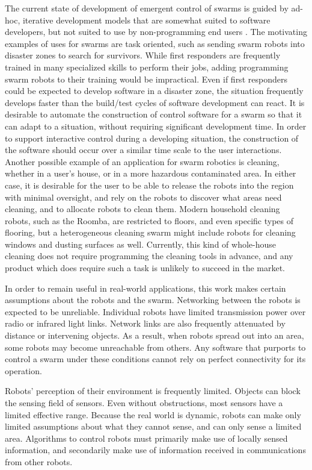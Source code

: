 \documentclass[]{article}
\begin{document}
The current state of development of emergent control of swarms is guided by ad-hoc, iterative development models that are somewhat suited to software developers, but not suited to use by non-programming end users \cite{palmer2005behavioral}.
The motivating examples of uses for swarms are task oriented, such as sending swarm robots into disaster zones to search for survivors. 
While first responders are frequently trained in many specialized skills to perform their jobs, adding programming swarm robots to their training would be impractical. 
Even if first responders could be expected to develop software in a disaster zone, the situation frequently develops faster than the build/test cycles of software development can react. 
It is desirable to automate the construction of control software for a swarm so that it can adapt to a situation, without requiring significant development time. 
In order to support interactive control during a developing situation, the construction of the software should occur over a similar time scale to the user interactions.
Another possible example of an application for swarm robotics is cleaning, whether in a user's house, or in a more hazardous contaminated area. 
In either case, it is desirable for the user to be able to release the robots into the region with minimal oversight, and rely on the robots to discover what areas need cleaning, and to allocate robots to clean them. 
Modern household cleaning robots, such as the Roomba, are restricted to floors, and even specific types of flooring, but a heterogeneous cleaning swarm might include robots for cleaning windows and dusting surfaces as well. 
Currently, this kind of whole-house cleaning does not require programming the cleaning tools in advance, and any product which does require such a task is unlikely to succeed in the market. 

In order to remain useful in real-world applications, this work makes certain assumptions about the robots and the swarm. 
Networking between the robots is expected to be unreliable. 
Individual robots have limited transmission power over radio or infrared light links. 
Network links are also frequently attenuated by distance or intervening objects. 
As a result, when robots spread out into an area, some robots may become unreachable from others. 
Any software that purports to control a swarm under these conditions cannot rely on perfect connectivity for its operation. 

Robots' perception of their environment is frequently limited. 
Objects can block the sensing field of sensors.
Even without obstructions, most sensors have a limited effective range. 
Because the real world is dynamic, robots can make only limited assumptions about what they cannot sense, and can only sense a limited area. 
Algorithms to control robots must primarily make use of locally sensed information, and secondarily make use of information received in communications from other robots. 
\end{document}
